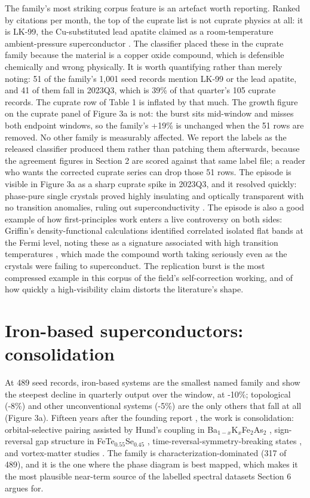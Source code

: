 \documentclass[
  11pt,
]{article}
\begin{document}
The family's most striking corpus feature is an artefact worth
reporting. Ranked by citations per month, the top of the cuprate list is
not cuprate physics at all: it is LK-99, the Cu-substituted lead apatite
claimed as a room-temperature ambient-pressure superconductor
\citep{lee2023lk99, lee2023superconductor}. The classifier placed these
in the cuprate family because the material is a copper oxide compound,
which is defensible chemically and wrong physically. It is worth
quantifying rather than merely noting: 51 of the family's 1,001 seed
records mention LK-99 or the lead apatite, and 41 of them fall in
2023Q3, which is 39\% of that quarter's 105 cuprate records. The cuprate
row of Table 1 is inflated by that much. The growth figure on the
cuprate panel of Figure 3a is not: the burst sits mid-window and misses
both endpoint windows, so the family's +19\% is unchanged when the 51
rows are removed. No other family is measurably affected. We report the
labels as the released classifier produced them rather than patching
them afterwards, because the agreement figures in Section 2 are scored
against that same label file; a reader who wants the corrected cuprate
series can drop those 51 rows. The episode is visible in Figure 3a as a
sharp cuprate spike in 2023Q3, and it resolved quickly: phase-pure
single crystals proved highly insulating and optically transparent with
no transition anomalies, ruling out superconductivity
\citep{puphal2023single}. The episode is also a good example of how
first-principles work enters a live controversy on both sides: Griffin's
density-functional calculations identified correlated isolated flat
bands at the Fermi level, noting these as a signature associated with
high transition temperatures \citep{griffin2023origin}, which made the
compound worth taking seriously even as the crystals were failing to
superconduct. The replication burst is the most compressed example in
this corpus of the field's self-correction working, and of how quickly a
high-visibility claim distorts the literature's shape.

\section{Iron-based superconductors:
consolidation}\label{iron-based-superconductors-consolidation}

At 489 seed records, iron-based systems are the smallest named family
and show the steepest decline in quarterly output over the window, at
-10\%; topological (-8\%) and other unconventional systems (-5\%) are
the only others that fall at all (Figure 3a). Fifteen years after the
founding report \citep{kamihara2008iron}, the work is consolidation:
orbital-selective pairing assisted by Hund's coupling in
Ba\(_{1-x}\)K\(_x\)Fe\(_2\)As\(_2\) \citep{corbae2025hunds},
sign-reversal gap structure in FeTe\(_{0.55}\)Se\(_{0.45}\)
\citep{hou2025distinct}, time-reversal-symmetry-breaking states
\citep{bartl2025evidence}, and vortex-matter studies
\citep{sanchez2023disordered, iguchi2023observation}. The family is
characterization-dominated (317 of 489), and it is the one where the
phase diagram is best mapped, which makes it the most plausible
near-term source of the labelled spectral datasets Section 6 argues for.
\end{document}
